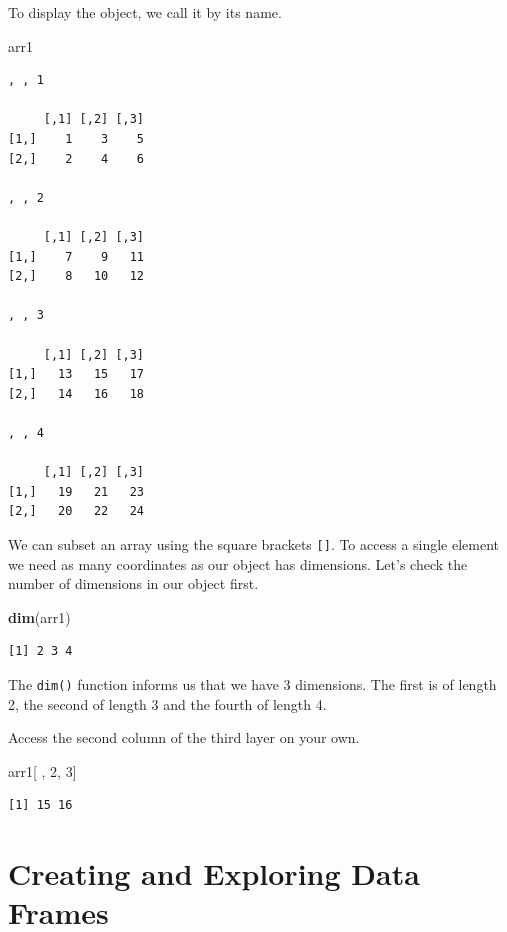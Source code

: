 \documentclass[]{article}
\newenvironment{Shaded}{\begin{snugshade}}{\end{snugshade}}
\newcommand{\DecValTok}[1]{\textcolor[rgb]{0.00,0.00,0.81}{#1}}
\newcommand{\KeywordTok}[1]{\textcolor[rgb]{0.13,0.29,0.53}{\textbf{#1}}}
\newcommand{\NormalTok}[1]{#1}
\begin{document}
To display the object, we call it by its name.

\begin{Shaded}
\begin{Highlighting}[]
\NormalTok{arr1}
\end{Highlighting}
\end{Shaded}

\begin{verbatim}
, , 1

     [,1] [,2] [,3]
[1,]    1    3    5
[2,]    2    4    6

, , 2

     [,1] [,2] [,3]
[1,]    7    9   11
[2,]    8   10   12

, , 3

     [,1] [,2] [,3]
[1,]   13   15   17
[2,]   14   16   18

, , 4

     [,1] [,2] [,3]
[1,]   19   21   23
[2,]   20   22   24
\end{verbatim}

We can subset an array using the square brackets \texttt{{[}{]}}. To access a single element we need as many coordinates as our object has dimensions. Let's check the number of dimensions in our object first.

\begin{Shaded}
\begin{Highlighting}[]
\KeywordTok{dim}\NormalTok{(arr1)}
\end{Highlighting}
\end{Shaded}

\begin{verbatim}
[1] 2 3 4
\end{verbatim}

The \texttt{dim()} function informs us that we have 3 dimensions. The first is of length 2, the second of length 3 and the fourth of length 4.

Access the second column of the third layer on your own.

\begin{Shaded}
\begin{Highlighting}[]
\NormalTok{arr1[ , }\DecValTok{2}\NormalTok{, }\DecValTok{3}\NormalTok{] }
\end{Highlighting}
\end{Shaded}

\begin{verbatim}
[1] 15 16
\end{verbatim}

\hypertarget{creating-and-exploring-data-frames}{%
\section{Creating and Exploring Data Frames}\label{creating-and-exploring-data-frames}}
\end{document}
